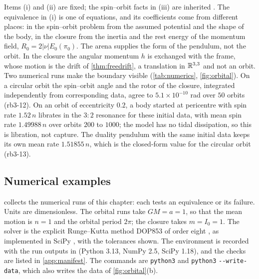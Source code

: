 Items (i) and (ii) are fixed; the spin--orbit facts in (iii) are inherited \cite{GoldreichPeale66,MurrayDermott99}. The equivalence in (i) is one of
equations, and its coefficients come from different places: in the spin--orbit problem from the assumed potential and the shape of the body, in
the closure from the inertia and the rest energy of the momentum field, $R_0=2|\nu|E_0(\pi_0)$. The arena supplies the form of the pendulum, not the
orbit. In the closure the angular momentum $h$ is exchanged with the frame, whose motion is the drift of \cref{thm:freedrift}, a translation in
$\mathbb{R}^{3,3}$ and not an orbit. Two numerical runs make the boundary visible (\cref{tab:numerics}, \cref{fig:orbital}). On a circular orbit the
spin--orbit angle and the rotor of the closure, integrated independently from corresponding data, agree to $5.1\times10^{-10}$ rad over $50$ orbits
(rb3-12). On an orbit of eccentricity $0.2$, a body started at pericentre with spin rate $1.52\,n$ librates in the $3{:}2$ resonance for these
initial data, with mean spin rate $1.49988\,n$ over orbits $200$ to $1000$; the model has no tidal dissipation, so this is libration, not
capture. The duality pendulum with the same initial data keeps its own mean rate $1.51855\,n$, which is the
closed-form value for the circular orbit (rb3-13).

\subsection{Numerical examples}
\label{sec:orbital:numerics}

 collects the numerical runs of this chapter: each tests an equivalence or its failure. Units are dimensionless. The orbital
runs take $GM=a=1$, so that the mean motion is $n=1$ and the orbital period $2\pi$; the closure takes $m=I_0=1$. The solver is the explicit
Runge--Kutta method DOP853 of order eight \cite{HairerNorsettWanner93}, as implemented in SciPy \cite{Virtanen2020}, with the tolerances shown.
The environment is recorded with the run outputs in  (Python 3.13, NumPy 2.5, SciPy 1.18), and the
checks are listed in \cref{app:manifest}. The commands are
\texttt{python3}  and \texttt{python3}  \texttt{-{}-write-data}, which also writes
the data of \cref{fig:orbital}(b).

